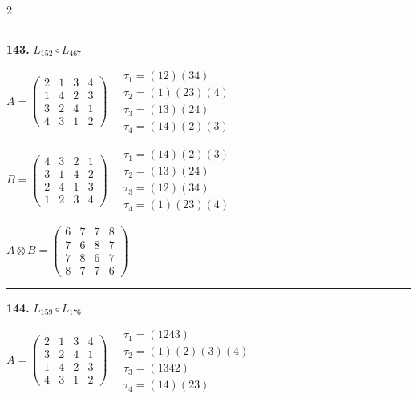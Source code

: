 \begin{multicols}{2}
\vspace{0.3em}
\hrule
\vspace{0.3em}

\noindent\textbf{143.} $L_{152} \circ L_{467}$

$A = \begin{pmatrix} 2 & 1 & 3 & 4 \\ 1 & 4 & 2 & 3 \\ 3 & 2 & 4 & 1 \\ 4 & 3 & 1 & 2 \end{pmatrix} \quad \begin{matrix} \tau_{1}=(1 2)(3 4) \\ \tau_{2}=(1)(2 3)(4) \\ \tau_{3}=(1 3)(2 4) \\ \tau_{4}=(1 4)(2)(3) \end{matrix}$

$B = \begin{pmatrix} 4 & 3 & 2 & 1 \\ 3 & 1 & 4 & 2 \\ 2 & 4 & 1 & 3 \\ 1 & 2 & 3 & 4 \end{pmatrix} \quad \begin{matrix} \tau_{1}=(1 4)(2)(3) \\ \tau_{2}=(1 3)(2 4) \\ \tau_{3}=(1 2)(3 4) \\ \tau_{4}=(1)(2 3)(4) \end{matrix}$

$A \otimes B = \begin{pmatrix} 6 & 7 & 7 & 8 \\ 7 & 6 & 8 & 7 \\ 7 & 8 & 6 & 7 \\ 8 & 7 & 7 & 6 \end{pmatrix}$

\vspace{0.3em}
\hrule
\vspace{0.3em}

\noindent\textbf{144.} $L_{159} \circ L_{176}$

$A = \begin{pmatrix} 2 & 1 & 3 & 4 \\ 3 & 2 & 4 & 1 \\ 1 & 4 & 2 & 3 \\ 4 & 3 & 1 & 2 \end{pmatrix} \quad \begin{matrix} \tau_{1}=(1 2 4 3) \\ \tau_{2}=(1)(2)(3)(4) \\ \tau_{3}=(1 3 4 2) \\ \tau_{4}=(1 4)(2 3) \end{matrix}$


\end{multicols}
